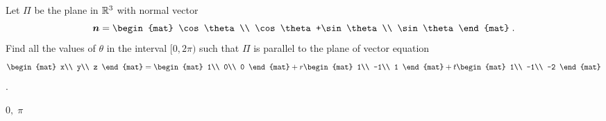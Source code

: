 
\begin{Exercise}[
name={},
title={}, 
difficulty=0,
origin={\cite{AG}}]
Let $\Pi$ be the plane in $\mathbb{R}^3$ with normal vector $$\vec{n}=
\begin{mat}
\cos\theta\\
\cos\theta+\sin\theta\\
\sin\theta
\end{mat}
\;.$$ Find all the values of $\theta$ in the interval $[0,2\pi)$ such that $\Pi$ is parallel to the plane of vector equation
$$
\begin{mat}
x\\
y\\
z
\end{mat}
=
\begin{mat}
1\\
0\\
0
\end{mat}
+r
\begin{mat}
1\\
-1\\
1
\end{mat}
+t
\begin{mat}
1\\
-1\\
-2
\end{mat}
$$.

\end{Exercise}

\begin{Answer}
$0,\;\pi$
\end{Answer}
